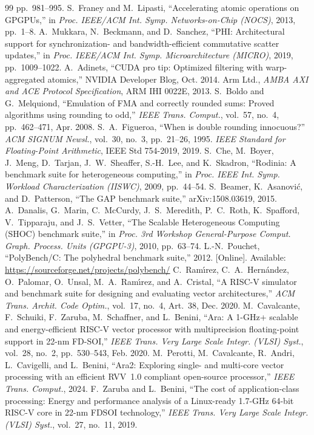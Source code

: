 \documentclass[journal]{IEEEtran}
\begin{document}
\begin{thebibliography}{99}
pp.~981--995.
 S.~Franey and M.~Lipasti, ``Accelerating atomic operations on
GPGPUs,'' in \emph{Proc. IEEE/ACM Int. Symp. Networks-on-Chip (NOCS)}, 2013,
pp.~1--8.
 A.~Mukkara, N.~Beckmann, and D.~Sanchez, ``PHI: Architectural
support for synchronization- and bandwidth-efficient commutative scatter
updates,'' in \emph{Proc. IEEE/ACM Int. Symp. Microarchitecture (MICRO)}, 2019,
pp.~1009--1022.
 A.~Adinets, ``CUDA pro tip: Optimized filtering with
warp-aggregated atomics,'' NVIDIA Developer Blog, Oct. 2014.
 Arm Ltd., \emph{AMBA AXI and ACE Protocol Specification}, ARM IHI
0022E, 2013.
 S.~Boldo and G.~Melquiond, ``Emulation of FMA and correctly rounded
sums: Proved algorithms using rounding to odd,'' \emph{IEEE Trans. Comput.}, vol.~57,
no.~4, pp.~462--471, Apr. 2008.
 S.~A.~Figueroa, ``When is double rounding innocuous?''
\emph{ACM SIGNUM Newsl.}, vol.~30, no.~3, pp.~21--26, 1995.
 \emph{IEEE Standard for Floating-Point Arithmetic}, IEEE Std
754-2019, 2019.
 S.~Che, M.~Boyer, J.~Meng, D.~Tarjan, J.~W.~Sheaffer, S.-H.~Lee,
and K.~Skadron, ``Rodinia: A benchmark suite for heterogeneous computing,'' in
\emph{Proc. IEEE Int. Symp. Workload Characterization (IISWC)}, 2009, pp.~44--54.
 S.~Beamer, K.~Asanovi\'c, and D.~Patterson, ``The GAP benchmark suite,''
arXiv:1508.03619, 2015.
 A.~Danalis, G.~Marin, C.~McCurdy, J.~S.~Meredith, P.~C.~Roth, K.~Spafford,
V.~Tipparaju, and J.~S.~Vetter, ``The Scalable Heterogeneous Computing (SHOC) benchmark
suite,'' in \emph{Proc. 3rd Workshop General-Purpose Comput. Graph. Process. Units
(GPGPU-3)}, 2010, pp.~63--74.
 L.-N.~Pouchet, ``PolyBench/C: The polyhedral benchmark suite,''
2012. [Online]. Available: \url{https://sourceforge.net/projects/polybench/}
 C.~Ram\'{\i}rez, C.~A.~Hern\'andez, O.~Palomar, O.~Unsal,
M.~A.~Ram\'{\i}rez, and A.~Cristal, ``A RISC-V simulator and benchmark suite for
designing and evaluating vector architectures,'' \emph{ACM Trans. Archit. Code
Optim.}, vol.~17, no.~4, Art.~38, Dec. 2020.
 M.~Cavalcante, F.~Schuiki, F.~Zaruba, M.~Schaffner, and L.~Benini,
``Ara: A 1-GHz+ scalable and energy-efficient RISC-V vector processor with
multiprecision floating-point support in 22-nm FD-SOI,'' \emph{IEEE Trans. Very Large
Scale Integr. (VLSI) Syst.}, vol.~28, no.~2, pp.~530--543, Feb. 2020.
 M.~Perotti, M.~Cavalcante, R.~Andri, L.~Cavigelli, and L.~Benini,
``Ara2: Exploring single- and multi-core vector processing with an efficient RVV~1.0
compliant open-source processor,'' \emph{IEEE Trans. Comput.}, 2024.
 F.~Zaruba and L.~Benini, ``The cost of application-class processing:
Energy and performance analysis of a Linux-ready 1.7-GHz 64-bit RISC-V core in 22-nm
FDSOI technology,'' \emph{IEEE Trans. Very Large Scale Integr. (VLSI) Syst.},
vol.~27, no.~11, 2019.
\end{thebibliography}
\end{document}
